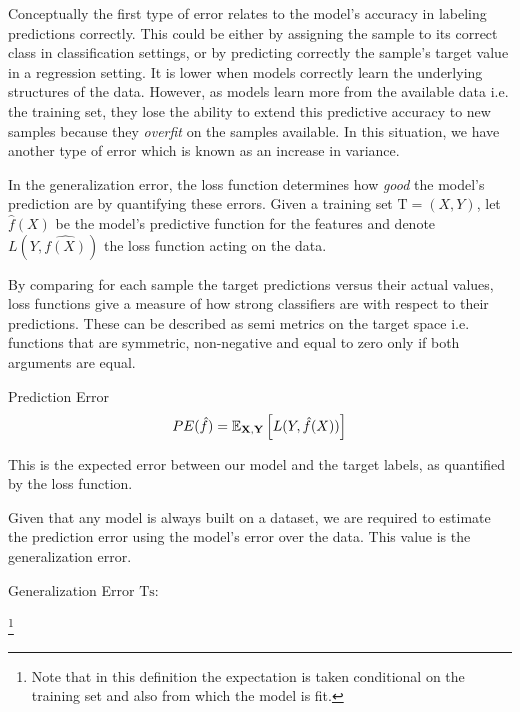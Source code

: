 Conceptually the first type of error relates to the model's accuracy in labeling predictions correctly. This could be either by assigning the sample to its correct class in classification settings, or by predicting correctly the sample's target value in a regression setting. It is lower when models correctly learn the underlying structures of the data. However, as models learn more from the available data i.e. the training set, they lose the ability to extend this predictive accuracy to new samples because they \textit{overfit} on the samples available. In this situation, we have another type of error which is known as an increase in variance.

In the generalization error, the loss function determines how \textit{good} the model's prediction are by quantifying these errors. Given a training set $\mathrm{T} = (X,Y)$, let $\hat{f}(X)$ be the model's predictive function for the features and denote $L( Y,\hat{f(X)} )$ the loss function acting on the data.

By comparing for each sample the target predictions versus their actual values, loss functions give a measure of how strong classifiers are with respect to their predictions. These can be described as semi metrics on the target space i.e. functions that are symmetric, non-negative and equal to zero only if both arguments are equal.


\begin{definition}{Prediction Error}
\[ 
 PE(\hat{f})= \operatorname{\mathbb{E}}_{\textbf{X},\textbf{Y}} \left[ L(Y,\hat{f}(X))\right]
\]
\end{definition}

This is the expected error between our model and the target labels, as quantified by the loss function.

Given that any model is always built on a dataset, we are required to estimate the prediction error using the model's error over the data. This value is the generalization error.

\begin{definition}{Generalization Error}
 $\mathrm{Ts}$:
\[ 
\]
\end{definition}\footnote{Note that in this definition the expectation is taken conditional on the training set and also from which the model is fit.}

